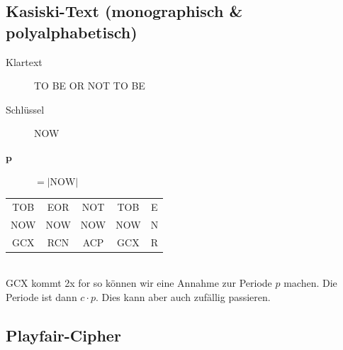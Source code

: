 \documentclass[landscape,twocolumn,a4paper]{article}
\newcommand{\T}[1]{\text{#1}} %
\newcommand{\Abs}[1]{\left| #1 \right|} %
\begin{document}
\subsection{Kasiski-Text (monographisch \& polyalphabetisch)}
\begin{description}
	\item[Klartext] TO BE OR NOT TO BE
	\item[Schlüssel] NOW
	\item[$\mathbf{p}$] $=\Abs{\T{NOW}}$
\end{description}
\begin{tabular}{c|c|c|c|c}
 TOB&EOR&NOT&TOB&E\\
 NOW&NOW&NOW&NOW&N\\
 GCX&RCN&ACP&GCX&R
\end{tabular}\\
GCX kommt 2x for so können wir eine Annahme zur Periode $p$ machen. Die Periode ist dann $c\cdot p$. Dies kann aber auch zufällig passieren.
\subsection{Playfair-Cipher}
\end{document}
